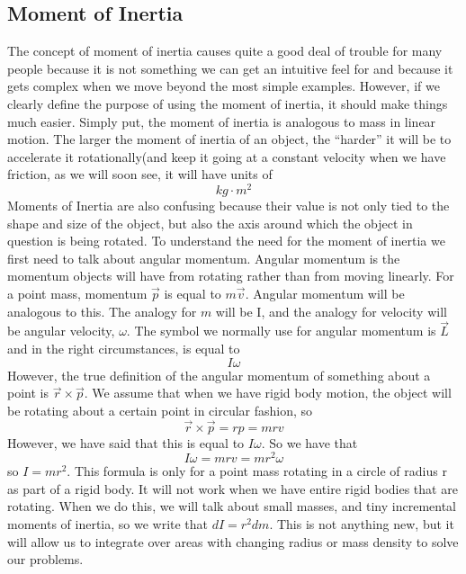 \documentclass{article}[gray]
\numberwithin{equation}{subsection}
\begin{document}
\subsection{Moment of Inertia}
\newline

The concept of moment of inertia causes quite a good deal of trouble for many people because it is not something we can get an intuitive feel for and because it gets complex when we move beyond the most simple examples. However, if we clearly define the purpose of using the moment of inertia, it should make things much easier. Simply put, the moment of inertia is analogous to mass in linear motion. The larger the moment of inertia of an object, the “harder” it will be to accelerate it rotationally(and keep it going at a constant velocity when we have friction, as we will soon see, it will have units of $$kg \cdot m^2$$ Moments of Inertia are also confusing because their value is not only tied to the shape and size of the object, but also the axis around which the object in question is being rotated. To understand the need for the moment of inertia we first need to talk about angular momentum. Angular momentum is the momentum objects will have from rotating rather than from moving linearly. For a point mass, momentum $\vec{p}$ is equal to $m\vec{v}$. Angular momentum will be analogous to this. The analogy for $m$ will be I, and the analogy for velocity will be angular velocity, $\omega$. The symbol we normally use for angular momentum is $\vec{L}$ and in the right circumstances, is equal to $$I\omega$$ However, the true definition of the angular momentum of something about a point is $\vec{r} \times \vec{p}$. We assume that when we have rigid body motion, the object will be rotating about a certain point in circular fashion, so \begin{equation}\vec{r} \times \vec{p} = rp = mrv\end{equation} However, we have said that this is equal to $I\omega$. So we have that $$I\omega=mrv=mr^2\omega$$ so $I=mr^2$. This formula is only for a point mass rotating in a circle of radius r as part of a rigid body. It will not work when we have entire rigid bodies that are rotating. When we do this, we will talk about small masses, and tiny incremental moments of inertia, so we write that $dI=r^2 dm$. This is not anything new, but it will allow us to integrate over areas with changing radius or mass density to solve our problems. 
\end{document}
